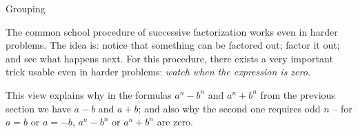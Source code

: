 \secc Grouping

The common school procedure of successive factorization works even in harder problems. The idea is: notice that something can be factored out; factor it out; and see what happens next. For this procedure, there exists a very important trick usable even in harder problems: \textit{watch when the expression is zero}.


This view explains why in the formulas $a^n-b^n$ and $a^n+b^n$ from the previous section we have $a-b$ and $a+b$; and also why the second one requires odd $n$ -- for $a=b$ or $a=-b$, $a^n-b^n$ or $a^n + b^n$ are zero.

